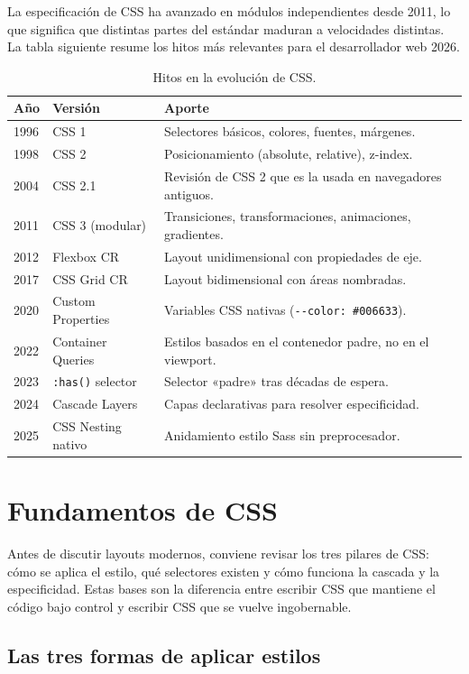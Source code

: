 La especificación de CSS ha avanzado en módulos
independientes desde 2011, lo que significa que distintas partes del
estándar maduran a velocidades distintas. La tabla siguiente resume
los hitos más relevantes para el desarrollador web 2026.


\begin{table}[htbp]
\centering
\caption{Hitos en la evolución de CSS.}
\footnotesize
\begin{tabularx}{\textwidth}{llX}
\toprule
\textbf{Año} & \textbf{Versión} & \textbf{Aporte}\\
\midrule
1996 & CSS 1     & Selectores básicos, colores, fuentes, márgenes.\\
1998 & CSS 2     & Posicionamiento (absolute, relative), z-index.\\
2004 & CSS 2.1   & Revisión de CSS 2 que es la usada en navegadores antiguos.\\
2011 & CSS 3 (modular) & Transiciones, transformaciones, animaciones, gradientes.\\
2012 & Flexbox CR  & Layout unidimensional con propiedades de eje.\\
2017 & CSS Grid CR & Layout bidimensional con áreas nombradas.\\
2020 & Custom Properties & Variables CSS nativas (\texttt{-{}-color: \#006633}).\\
2022 & Container Queries & Estilos basados en el contenedor padre, no en el viewport.\\
2023 & \texttt{:has()} selector & Selector «padre» tras décadas de espera.\\
2024 & Cascade Layers & Capas declarativas para resolver especificidad.\\
2025 & CSS Nesting nativo & Anidamiento estilo Sass sin preprocesador.\\
\bottomrule
\end{tabularx}
\end{table}

\section{Fundamentos de CSS}

Antes de discutir layouts modernos, conviene revisar los tres
pilares de CSS: cómo se aplica el estilo, qué selectores existen y
cómo funciona la cascada y la especificidad. Estas bases son la
diferencia entre escribir CSS que mantiene el código bajo control y
escribir CSS que se vuelve ingobernable.


\subsection{Las tres formas de aplicar estilos}

